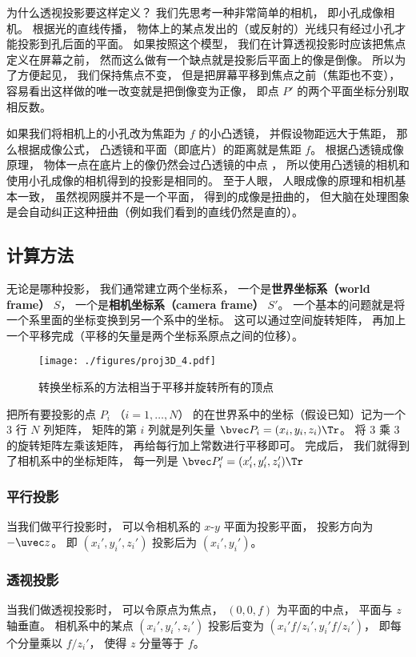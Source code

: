 为什么透视投影要这样定义？ 我们先思考一种非常简单的相机， 即小孔成像相机。 根据光的直线传播， 物体上的某点发出的（或反射的）光线只有经过小孔才能投影到孔后面的平面。 如果按照这个模型， 我们在计算透视投影时应该把焦点定义在屏幕之前， 然而这么做有一个缺点就是投影后平面上的像是倒像。 所以为了方便起见， 我们保持焦点不变， 但是把屏幕平移到焦点之前（焦距也不变）， 容易看出这样做的唯一改变就是把倒像变为正像， 即点 $P'$ 的两个平面坐标分别取相反数。 %

如果我们将相机上的小孔改为焦距为 $f$ 的小凸透镜， 并假设物距远大于焦距， 那么根据成像公式， 凸透镜和平面（即底片）的距离就是焦距 $f$。 根据凸透镜成像原理， 物体一点在底片上的像仍然会过凸透镜的中点%
， 所以使用凸透镜的相机和使用小孔成像的相机得到的投影是相同的。 至于人眼， 人眼成像的原理和相机基本一致， 虽然视网膜并不是一个平面， 得到的成像是扭曲的， 但大脑在处理图象是会自动纠正这种扭曲（例如我们看到的直线仍然是直的）。

\subsection{计算方法}
无论是哪种投影， 我们通常建立两个坐标系， 一个是\textbf{世界坐标系（world frame）} $S$， 一个是\textbf{相机坐标系}\textbf{（camera frame）} $S'$。 一个基本的问题就是将一个系里面的坐标变换到另一个系中的坐标。 这可以通过空间旋转矩阵， 再加上一个平移完成（平移的矢量是两个坐标系原点之间的位移）。
\begin{figure}[ht]
\centering
\texttt{[image: ./figures/proj3D\_4.pdf]}
\caption{转换坐标系的方法相当于平移并旋转所有的顶点} \label{proj3D_fig4}
\end{figure}
把所有要投影的点 $P_i$ （$i = 1, \dots, N$） 的在世界系中的坐标（假设已知）记为一个 3 行 $N$ 列矩阵， 矩阵的第 $i$ 列就是列矢量 $\bvec P_i = (x_i, y_i, z_i)\Tr$。 将 3 乘 3 的旋转矩阵左乘该矩阵， 再给每行加上常数进行平移即可。 完成后， 我们就得到了相机系中的坐标矩阵， 每一列是 $\bvec P_i' = (x_i', y_i', z_i')\Tr$

\subsubsection{平行投影}
当我们做平行投影时， 可以令相机系的 $x$-$y$ 平面为投影平面， 投影方向为 $-\uvec z$。 即 $(x_i', y_i', z_i')$ 投影后为 $(x_i', y_i')$。

\subsubsection{透视投影}
当我们做透视投影时， 可以令原点为焦点， $(0, 0, f)$ 为平面的中点， 平面与 $z$ 轴垂直。 相机系中的某点 $(x_i', y_i', z_i')$ 投影后变为 $(x_i' f/z_i', y_i' f/z_i')$， 即每个分量乘以 $f/z_i'$， 使得 $z$ 分量等于 $f$。

